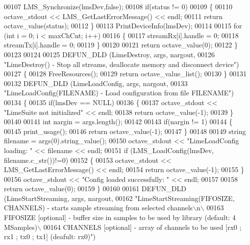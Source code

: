\begin{DoxyCode}
00107     LMS_Synchronize(lmsDev,\textcolor{keyword}{false});
00108     \textcolor{keywordflow}{if}(status != 0)
00109     \{
00110         octave\_stdout << LMS_GetLastErrorMessage() << endl;
00111         \textcolor{keywordflow}{return} octave\_value(status);
00112     \}
00113     PrintDeviceInfo(lmsDev);
00114 
00115     \textcolor{keywordflow}{for} (\textcolor{keywordtype}{int} i = 0; i < maxChCnt; i++)
00116     \{
00117         streamRx[i].handle = 0;
00118         streamTx[i].handle = 0;
00119     \}
00120 
00121     \textcolor{keywordflow}{return} octave\_value(0);
00122 \}
00123 
00124 
00125 DEFUN_DLD (LimeDestroy, args, nargout,
00126 \textcolor{stringliteral}{"LimeDestroy() - Stop all streams, deallocate memory and disconnect device"})
00127 \{
00128     FreeResources();
00129     \textcolor{keywordflow}{return} octave\_value\_list();
00130 \}
00131 
00132 DEFUN_DLD (LimeLoadConfig, args, nargout,
00133 \textcolor{stringliteral}{"LimeLoadConfig(FILENAME) - Load configuration from file FILENAME"})
00134 \{
00135     \textcolor{keywordflow}{if}(lmsDev == NULL)
00136     \{
00137         octave\_stdout << \textcolor{stringliteral}{"LimeSuite not initialized"} << endl;
00138         \textcolor{keywordflow}{return} octave\_value(-1);
00139     \}
00140 
00141     \textcolor{keywordtype}{int} nargin = args.length();
00142 
00143     \textcolor{keywordflow}{if}(nargin != 1)
00144     \{
00145         print\_usage();
00146         \textcolor{keywordflow}{return} octave\_value(-1);
00147     \}
00148 
00149     \textcolor{keywordtype}{string} filename = args(0).string\_value();
00150     octave\_stdout << \textcolor{stringliteral}{"LimeLoadConfig loading: "} << filename << endl;
00151     \textcolor{keywordflow}{if} (LMS_LoadConfig(lmsDev, filename.c\_str())!=0)
00152     \{
00153          octave\_stdout << LMS_GetLastErrorMessage() << endl;
00154          \textcolor{keywordflow}{return} octave\_value(-1);
00155     \}
00156     octave\_stdout << \textcolor{stringliteral}{"Config loaded successfully: "} << endl;
00157 
00158     \textcolor{keywordflow}{return} octave\_value(0);
00159 \}
00160 
00161 DEFUN_DLD (LimeStartStreaming, args, nargout,
00162 \textcolor{stringliteral}{"LimeStartStreaming(FIFOSIZE, CHANNELS) - starts sample streaming from selected channels\(\backslash\)n\(\backslash\)}
00163 \textcolor{stringliteral}{ FIFOSIZE [optional] - buffer size in samples to be used by library (default: 4 MSamples)\(\backslash\)}
00164 \textcolor{stringliteral}{ CHANNELS [optional] - array of channels to be used [rx0 ; rx1 ; tx0 ; tx1] (deafult: rx0)"})

\end{DoxyCode}
